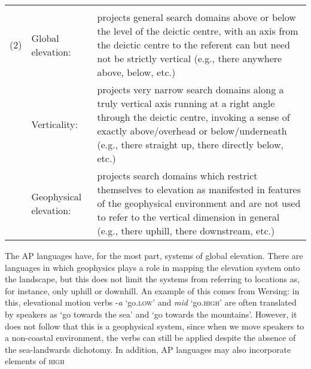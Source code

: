 \begin{flushleft}
\tablehead{}
\begin{supertabular}{m{0.39005986in}m{1.0268599in}m{4.04696in}}
 &
 &
\\
(2) &
Global elevation: &
projects general search domains above or below the level of the deictic centre, with an axis from the deictic centre to the referent can but need not be strictly vertical (e.g., there anywhere above, below, etc.)\\
 &
Verticality: &
projects very narrow search domains along a truly vertical axis running at a right angle through the deictic centre, invoking a sense of exactly above/overhead or below/underneath (e.g., there straight up, there directly below, etc.)\\
 &
Geophysical elevation: &
projects search domains which restrict themselves to elevation as manifested in features of the geophysical environment and are not used to refer to the vertical dimension in general (e.g., there uphill, there downstream, etc.)\\
\end{supertabular}
\end{flushleft}
The AP languages have, for the most part, systems of global elevation. There are languages in which geophysics plays a role in mapping the elevation system onto the landscape, but this does not limit the systems from referring to locations as, for instance, only uphill or downhill. An example of this comes from Wersing: in this, elevational motion verbs -\textit{a} {\textquoteleft}go.\textsc{low{\textquoteright}} and \textit{mid} {\textquoteleft}go.\textsc{high{\textquoteright} }are often translated by speakers as {\textquoteleft}go towards the sea{\textquoteright} and {\textquoteleft}go towards the mountains{\textquoteright}. However, it does not follow that this is a geophysical system, since when we move speakers to a non-coastal environment, the verbs can still be applied despite the absence of the sea-landwards dichotomy. In addition, AP languages may also incorporate elements of \textsc{high}

